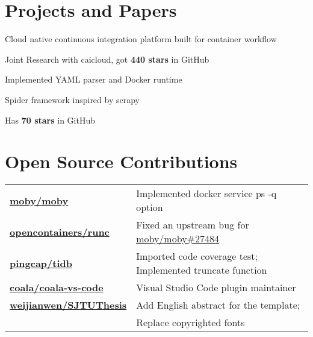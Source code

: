 \documentclass[]{deedy-resume-openfont}
\begin{document}
\begin{minipage}[t]{0.73\textwidth}

\section{Projects and Papers}
\sectionsep
{}
\begin{tightemize}
    \item Cloud native continuous integration platform built for container workflow
    \item Joint Research with caicloud, got \textbf{440 stars} in GitHub
    \item Implemented YAML parser and Docker runtime
    \end{tightemize}
\sectionsep

\begin{tightemize}
    \item Spider framework inspired by scrapy
    \item Has \textbf{70 stars} in GitHub
    \end{tightemize}
\sectionsep


\section{Open Source Contributions}
\begin{tabular}{ll}
\href{https://github.com/moby/moby/commits?author=gaocegege}{\bf moby/moby} & Implemented docker service ps -q option \\
\href{https://github.com/opencontainers/runc/commits?author=gaocegege}{\bf opencontainers/runc} & Fixed an upstream bug for \href{https://github.com/moby/moby/issues/27484}{moby/moby\#27484} \\
\href{https://github.com/pingcap/tidb/commits?author=gaocegege}{\bf pingcap/tidb} & Imported code coverage test; Implemented truncate function \\
\href{https://github.com/coala/coala-vs-code/commits/master?author=gaocegege}{\bf coala/coala-vs-code} & Visual Studio Code plugin maintainer \\
\href{https://github.com/weijianwen/SJTUThesis/commits?author=gaocegege}{\bf weijianwen/SJTUThesis} & Add English abstract for the template; \\
 &  Replace copyrighted fonts \\
\end{tabular}
\sectionsep


\end{minipage}
\end{document}
